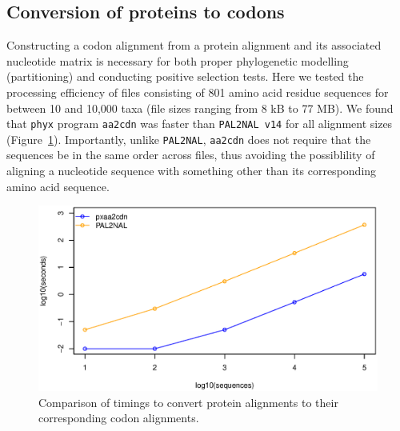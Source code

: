 \documentclass{article}
\begin{document}
\subsection{Conversion of proteins to codons}
Constructing a codon alignment from a protein alignment and its associated nucleotide matrix is necessary for both proper phylogenetic modelling (partitioning) and conducting positive selection tests. Here we tested the processing efficiency of files consisting of 801 amino acid residue sequences for between 10 and 10,000 taxa (file sizes ranging from 8 kB to 77 MB). We found that \texttt{phyx} program \texttt{aa2cdn} was faster than \texttt{PAL2NAL v14} \citep{Suyama2006} for all alignment sizes (Figure~\ref{fig:S2}). Importantly, unlike \texttt{PAL2NAL}, \texttt{aa2cdn} does not require that the sequences be in the same order across files, thus avoiding the possiblility of aligning a nucleotide sequence with something other than its corresponding amino acid sequence.

\begin{figure}[h]
    \centering
    \includegraphics[width=5.0in]{aa2cdn}
    \caption{Comparison of timings to convert protein alignments to
    their corresponding codon alignments.}
    \label{proteincodonfigure}
\label{fig:S2}
\end{figure}
\end{document}

